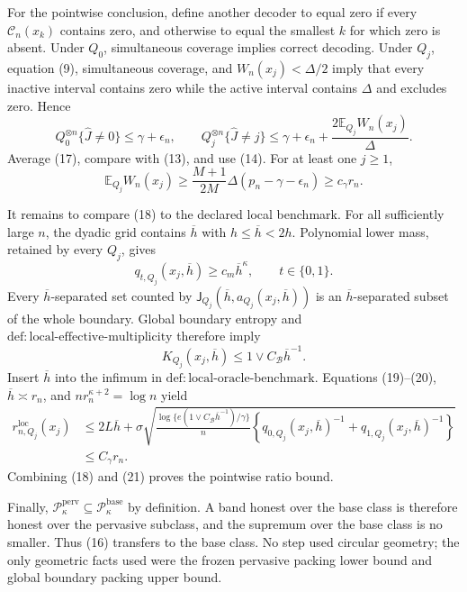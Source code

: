 For the pointwise conclusion, define another decoder to equal zero if every \(\mathcal C_n(x_k)\) contains zero, and otherwise to equal the smallest \(k\) for which zero is absent. Under \(Q_0\), simultaneous coverage implies correct decoding. Under \(Q_j\), equation (9), simultaneous coverage, and \(W_n(x_j)<\Delta/2\) imply that every inactive interval contains zero while the active interval contains \(\Delta\) and excludes zero. Hence
\[
 Q_0^{\otimes n}\{\widehat J\ne0\}\le\gamma+\epsilon_n,
 \qquad
 Q_j^{\otimes n}\{\widehat J\ne j\}
 \le\gamma+\epsilon_n+\frac{2\mathbb E_{Q_j}W_n(x_j)}\Delta. \tag{17}
\]
Average (17), compare with (13), and use (14). For at least one \(j\ge1\),
\[
 \mathbb E_{Q_j}W_n(x_j)
 \ge \frac{M+1}{2M}\Delta(p_n-\gamma-\epsilon_n)
 \ge c_\gamma r_n. \tag{18}
\]

It remains to compare (18) to the declared local benchmark. For all sufficiently large \(n\), the dyadic grid contains \(\overline h\) with \(h\le\overline h<2h\). Polynomial lower mass, retained by every \(Q_j\), gives
\[
 q_{t,Q_j}(x_j,\overline h)\ge c_m\overline h^\kappa,
 \qquad t\in\{0,1\}. \tag{19}
\]
Every \(\overline h\)-separated set counted by \(\mathsf J_{Q_j}(\overline h,a_{Q_j}(x_j,\overline h))\) is an \(\overline h\)-separated subset of the whole boundary. Global boundary entropy and \(\mathrm{def:local\text{-}effective\text{-}multiplicity}\) therefore imply
\[
 K_{Q_j}(x_j,\overline h)\le1\vee C_{\mathcal B}\overline h^{-1}. \tag{20}
\]
Insert \(\overline h\) into the infimum in \(\mathrm{def:local\text{-}oracle\text{-}benchmark}\). Equations (19)--(20), \(\overline h\asymp r_n\), and \(nr_n^{\kappa+2}=\log n\) yield
\[
 \begin{aligned}
 r_{n,Q_j}^{\mathrm{loc}}(x_j)
 &\le2L\overline h+
 \sigma\sqrt{\frac{\log\{e(1\vee C_{\mathcal B}\overline h^{-1})/\gamma\}}n
 \left\{q_{0,Q_j}(x_j,\overline h)^{-1}
       +q_{1,Q_j}(x_j,\overline h)^{-1}\right\}}\\
 &\le C_\gamma r_n. 
 \end{aligned} \tag{21}
\]
Combining (18) and (21) proves the pointwise ratio bound.

Finally, \(\mathcal P_{\kappa}^{\mathrm{perv}}\subseteq\mathcal P_{\kappa}^{\mathrm{base}}\) by definition. A band honest over the base class is therefore honest over the pervasive subclass, and the supremum over the base class is no smaller. Thus (16) transfers to the base class. No step used circular geometry; the only geometric facts used were the frozen pervasive packing lower bound and global boundary packing upper bound.